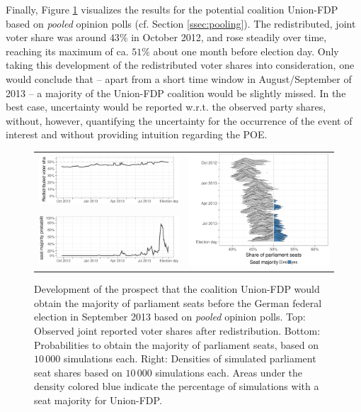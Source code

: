 \documentclass[smallcondensed]{svjour3}     %
\begin{document}
Finally, Figure \ref{fig:2013_cdufdp} visualizes the results for the potential
coalition Union-FDP based on \emph{pooled} opinion polls (cf. Section \ref{ssec:pooling}).
The redistributed, joint voter share was around $43\%$ in October 2012,
and rose steadily over time, reaching its maximum of ca. $51\%$ about one month
before election day. Only taking this development of the redistributed voter
shares into consideration, one would conclude that -- apart from a short
time window in August/September of 2013 -- a majority of the Union-FDP
coalition would be slightly missed.
In the best case, uncertainty would be reported w.r.t. the observed party shares,
without, however, quantifying the uncertainty for the occurrence of the event of
interest and without providing intuition regarding the POE.

\begin{figure}[H]\centering
\begin{tabular}{ll}
\includegraphics[height=.15\textwidth]{figures/2013_pooled_cdufdp_rawSharesRedist.pdf}
&
\multirow{2}{*}[13ex]{\includegraphics[height=.3\textwidth]{figures/2013_pooled_cdufdp_ridgeline.pdf}}
\\
\includegraphics[height=.15\textwidth]{figures/2013_pooled_cdufdp_prob.pdf}
\end{tabular}
\caption{Development of the prospect that the coalition Union-FDP would obtain
the majority of parliament seats before the German federal election in September
2013 based on \emph{pooled} opinion polls. Top: Observed joint reported voter shares after
redistribution. Bottom: Probabilities to obtain the majority of parliament seats,
based on $10\,000$ simulations each.
Right: Densities of simulated parliament seat shares based on $10\,000$ simulations each.
Areas under the density colored blue indicate the percentage of
simulations with a seat majority for Union-FDP.
\label{fig:2013_cdufdp}
}
\end{figure}
\end{document}
